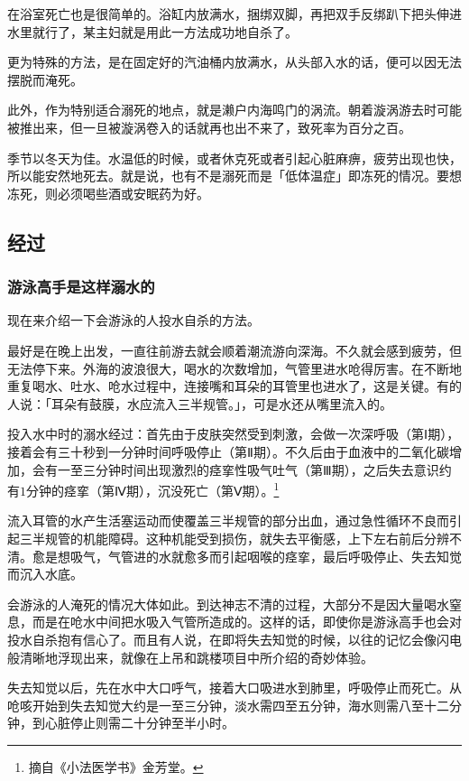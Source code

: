 \documentclass[UTF8]{ctexart}
\begin{document}
在浴室死亡也是很简单的。浴缸内放满水，捆绑双脚，再把双手反绑趴下把头伸进水里就行了，某主妇就是用此一方法成功地自杀了。

更为特殊的方法，是在固定好的汽油桶内放满水，从头部入水的话，便可以因无法摆脱而淹死。

此外，作为特别适合溺死的地点，就是濑户内海鸣门的涡流。朝着漩涡游去时可能被推出来，但一旦被漩涡卷入的话就再也出不来了，致死率为百分之百。

季节以冬天为佳。水温低的时候，或者休克死或者引起心脏麻痹，疲劳出现也快，所以能安然地死去。就是说，也有不是溺死而是「低体温症」即冻死的情况。要想冻死，则必须喝些酒或安眠药为好。

\subsection{经过}

\subsubsection*{游泳高手是这样溺水的}

现在来介绍一下会游泳的人投水自杀的方法。

最好是在晚上出发，一直往前游去就会顺着潮流游向深海。不久就会感到疲劳，但无法停下来。外海的波浪很大，喝水的次数增加，气管里进水呛得厉害。在不断地重复喝水、吐水、呛水过程中，连接嘴和耳朵的耳管里也进水了，这是关键。有的人说：「耳朵有鼓膜，水应流入三半规管。」，可是水还从嘴里流入的。

投入水中时的溺水经过：首先由于皮肤突然受到刺激，会做一次深呼吸（第Ⅰ期），接着会有三十秒到一分钟时间呼吸停止（第Ⅱ期）。不久后由于血液中的二氧化碳增加，会有一至三分钟时间出现激烈的痉挛性吸气吐气（第Ⅲ期），之后失去意识约有$1$分钟的痉挛（第Ⅳ期），沉没死亡（第Ⅴ期）。\footnote{摘自《小法医学书》金芳堂。}

流入耳管的水产生活塞运动而使覆盖三半规管的部分出血，通过急性循环不良而引起三半规管的机能障碍。这种机能受到损伤，就失去平衡感，上下左右前后分辨不清。愈是想吸气，气管进的水就愈多而引起咽喉的痉挛，最后呼吸停止、失去知觉而沉入水底。

会游泳的人淹死的情况大体如此。到达神志不清的过程，大部分不是因大量喝水窒息，而是在呛水中间把水吸入气管所造成的。这样的话，即使你是游泳高手也会对投水自杀抱有信心了。而且有人说，在即将失去知觉的时候，以往的记忆会像闪电般清晰地浮现出来，就像在上吊和跳楼项目中所介绍的奇妙体验。

失去知觉以后，先在水中大口呼气，接着大口吸进水到肺里，呼吸停止而死亡。从呛咳开始到失去知觉大约是一至三分钟，淡水需四至五分钟，海水则需八至十二分钟，到心脏停止则需二十分钟至半小时。
\end{document}
